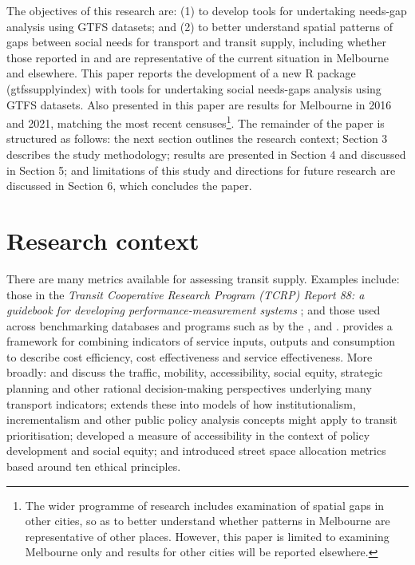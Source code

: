 \documentclass[preprint, 3p,
authoryear]{elsarticle} %
\begin{document}
The objectives of this research are: (1) to develop tools for
undertaking needs-gap analysis using GTFS datasets; and (2) to better
understand spatial patterns of gaps between social needs for transport
and transit supply, including whether those reported in
\citet{Currie2007Identifying} and \citet{currie2010identifying} are
representative of the current situation in Melbourne and elsewhere. This
paper reports the development of a new R package (gtfssupplyindex) with
tools for undertaking social needs-gaps analysis using GTFS datasets.
Also presented in this paper are results for Melbourne in 2016 and 2021,
matching the most recent censuses\footnote{The wider programme of
  research includes examination of spatial gaps in other cities, so as
  to better understand whether patterns in Melbourne are representative
  of other places. However, this paper is limited to examining Melbourne
  only and results for other cities will be reported elsewhere.}. The
remainder of the paper is structured as follows: the next section
outlines the research context; Section 3 describes the study
methodology; results are presented in Section 4 and discussed in Section
5; and limitations of this study and directions for future research are
discussed in Section 6, which concludes the paper.

\section{Research context}\label{research-context}

There are many metrics available for assessing transit supply. Examples
include: those in the \emph{Transit Cooperative Research Program (TCRP)
Report 88: a guidebook for developing performance-measurement systems}
\citep{Ryus:2003aa}; and those used across benchmarking databases and
programs such as by the
\citet{Florida-Transit-Information-System:2018aa}, \citet{UITP:2015aa}
and \citet{Imperial-College-London:2023aa}.
\citet{FieldingGordonJ1987Mpts} provides a framework for combining
indicators of service inputs, outputs and consumption to describe cost
efficiency, cost effectiveness and service effectiveness. More broadly:
\citet{Litman:2003ab} and \citet{Litman:2016aa} discuss the traffic,
mobility, accessibility, social equity, strategic planning and other
rational decision-making perspectives underlying many transport
indicators; \citet{Reynolds:2017ah} extends these into models of how
institutionalism, incrementalism and other public policy analysis
concepts might apply to transit prioritisation;
\citet{GuzmanLuisA.2017Aeit} developed a measure of accessibility in the
context of policy development and social equity; and
\citet{Creutzig2020streetspaceallocation} introduced street space
allocation metrics based around ten ethical principles.
\end{document}
